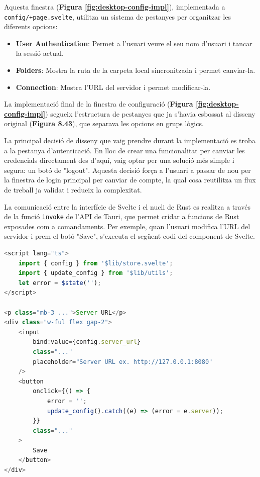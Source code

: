 Aquesta finestra (\textbf{Figura \ref{fig:desktop-config-impl}}), implementada a \texttt{config/+page.svelte}, utilitza un sistema de pestanyes per organitzar les diferents opcions:
\begin{itemize}
    \item \textbf{User Authentication}: Permet a l'usuari veure el seu nom d'usuari i tancar la sessió actual.
    \item \textbf{Folders}: Mostra la ruta de la carpeta local sincronitzada i permet canviar-la.
    \item \textbf{Connection}: Mostra l'URL del servidor i permet modificar-la.
\end{itemize}
La implementació final de la finestra de configuració (\textbf{Figura \ref{fig:desktop-config-impl}}) segueix l'estructura de pestanyes que ja s'havia esbossat al disseny original 
(\textbf{Figura 8.43}), que separava les opcions en grups lògics.

La principal decisió de disseny que vaig prendre durant la implementació es troba a la pestanya d'autenticació. En lloc de crear una funcionalitat per canviar les credencials 
directament des d'aquí, vaig optar per una solució més simple i segura: un botó de "logout". Aquesta decisió força a l'usuari a passar de nou per la finestra de login principal per 
canviar de compte, la qual cosa reutilitza un flux de treball ja validat i redueix la complexitat.

La comunicació entre la interfície de Svelte i el nucli de Rust es realitza a través de la funció \texttt{invoke} de l'API de Tauri, que permet cridar a funcions de Rust exposades com a comandaments. Per exemple, quan l'usuari modifica l'URL del servidor i prem el botó "Save", s'executa el següent codi del component de Svelte.

\begin{lstlisting}[language=typescript, caption={Exemple de crida al backend des de Svelte a \texttt{Connection.svelte}}]
<script lang="ts">
	import { config } from '$lib/store.svelte';
	import { update_config } from '$lib/utils';
	let error = $state('');
</script>

<p class="mb-3 ...">Server URL</p>
<div class="w-ful flex gap-2">
	<input
		bind:value={config.server_url}
		class="..."
		placeholder="Server URL ex. http://127.0.0.1:8080"
	/>
	<button
		onclick={() => {
			error = '';
			update_config().catch((e) => (error = e.server));
		}}
		class="..."
	>
		Save
	</button>
</div>
\end{lstlisting}

